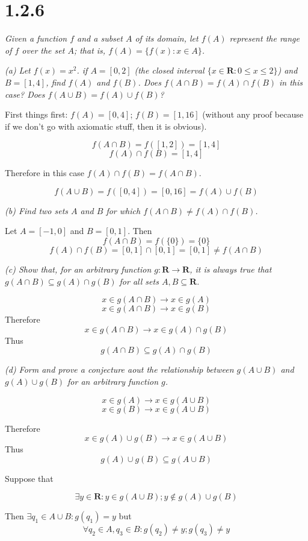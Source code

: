 \documentclass[11pt,oneside,titlepage]{book}
\begin{document}
\section*{1.2.6}
\textit{Given a function $f$ and a subset $A$ of its domain, let $f(A)$
  represent the range of $f$ over the set $A$; that is,
  $f(A) = \{f(x): x \in A\}$. }

\textit{(a) Let $f(x) = x^2$. if $A=[0,2]$ (the closed interval $\{x \in
  \textbf{R}: 0 \leq x \leq 2\}$) and $B=[1,4]$, find $f(A)$ and $f(B)$. Does
  $f (A \cap B) = f(A) \cap f(B)$ in this case? Does $f(A \cup B) = f(A) \cup
  f(B)$? }

First things first: $f(A) = [0, 4]$; $f(B) = [1, 16]$ (without any proof
because if we don't go with axiomatic stuff, then it is obvious).

$$f(A \cap B) = f([1, 2]) = [1, 4]$$
$$f(A) \cap f(B) = [1, 4]$$

Therefore in this case $f(A) \cap f(B) = f(A \cap B)$.

$$f(A \cup B) = f([0, 4]) = [0, 16] = f(A) \cup f(B)$$

\textit{(b) Find two sets $A$ and $B$ for which $f(A \cap B) \neq f(A) \cap f(B)$.}

Let $A = [-1, 0]$ and $B = [0, 1]$. Then
$$f(A \cap B) = f(\{0\}) = \{0\}$$
$$f(A) \cap f(B) = [0, 1] \cap [0, 1] = [0, 1] \neq f(A \cap B)$$

\textit{(c) Show that, for an arbitrary function $g: \textbf{R} \to \textbf{R}$, it
  is always true that $g(A \cap B) \subseteq g(A) \cap g(B)$ for all sets
  $A,B \subseteq \textbf{R}$.}

$$x \in g(A \cap B) \to x \in g(A)$$
$$x \in g(A \cap B) \to x \in g(B)$$
Therefore
$$x \in g(A \cap B) \to x \in g(A) \cap g(B)$$
Thus
$$g(A \cap B) \subseteq g(A) \cap g(B)$$

\textit{(d) Form and prove a conjecture aout the relationship between
  $g(A \cup B)$ and $g(A) \cup g(B)$ for an arbitrary function $g$.}

$$x \in g(A) \to x \in g(A \cup B)$$
$$x \in g(B) \to x \in g(A \cup B)$$

Therefore
$$x \in g(A) \cup g(B) \to x \in g(A \cup B)$$
Thus
$$g(A) \cup g(B) \subseteq g(A \cup B)$$

Suppose that

$$\exists y \in \textbf{R}: y \in g(A \cup B); y \notin g(A) \cup g(B)$$

Then $\exists q_1 \in A \cup B: g(q_1) = y$ but
$$\forall q_2 \in A, q_3 \in B: g(q_2) \neq y; g(q_3) \neq y$$
\end{document}
